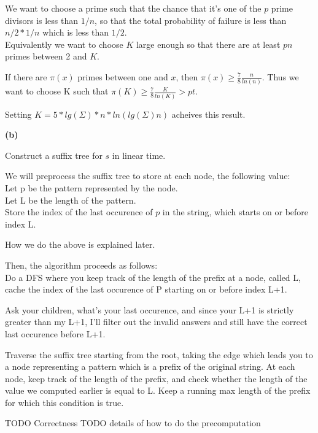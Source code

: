 \documentclass[11pt]{article}
\renewcommand{\part}[1] {\vspace{.10in} {\bf (#1)}}
\begin{document}
We want to choose a prime such that the chance that it's one of the $p$ prime divisors is less than $1/n$, so that the total probability of failure is less than $n/2 * 1/n$ which is less than $1/2$.\\
Equivalently we want to choose $K$ large enough so that there are at least $pn$ primes between 2 and $K$.

If there are $\pi(x)$ primes between one and $x$, then $\pi(x) \geq \frac{7}{8} \frac{n}{ln(n)}$.
Thus we want to choose K such that
$\pi(K) \geq \frac{7}{8} \frac{K}{ln(K)} > pt$.

Setting $K = 5*lg(\Sigma)*n*ln(lg(\Sigma)n)$ acheives this result.


\part{b}

Construct a suffix tree for $s$ in linear time.

We will preprocess the suffix tree to store at each node, the following value:\\
Let p be the pattern represented by the node.\\
Let L be the length of the pattern.\\
Store the index of the last occurence of $p$ in the string, which starts on or before index L.

How we do the above is explained later.

Then, the algorithm proceeds as follows:\\



Do a DFS where you keep track of the length of the prefix at a node, called L,
cache the index of the last occurence of P starting on or before index L+1.

Ask your children, what's your last occurence, and since your L+1 is strictly greater than my L+1, I'll filter out the invalid answers and still have the correct last occurence before L+1.

Traverse the suffix tree starting from the root, taking the edge which leads you to a node representing a pattern which is a prefix of the original string.
At each node, keep track of the length of the prefix, and check whether the length of the value we computed earlier is equal to L.
Keep a running max length of the prefix for which this condition is true.


TODO Correctness
TODO details of how to do the precomputation
\end{document}
